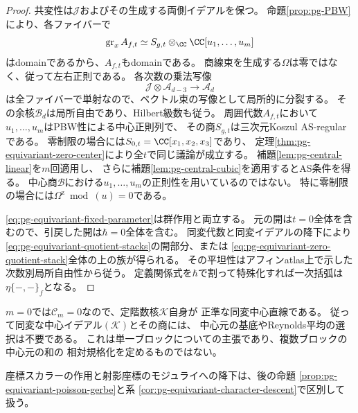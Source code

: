 \begin{proof}
共変性は$\mathcal J$およびその生成する両側イデアルを保つ。
命題\ref{prop:pg-PBW}により、各ファイバーで
\begin{equation}
 \operatorname{gr}_x A_{f,t}
 \simeq S_{g,t}\otimes_\CC\CC[u_1,\ldots,u_m]
 \label{eq:pg-equivariant-fiber-domain}
\end{equation}
はdomainであるから、$A_{f,t}$もdomainである。
商線束を生成する$\Omega$は零ではなく、従って左右正則である。
各次数の乗法写像
\begin{equation}
 \mathcal J\otimes\mathcal A_{d-3}\longrightarrow\mathcal A_d
 \label{eq:pg-equivariant-regular-multiplication}
\end{equation}
は全ファイバーで単射なので、ベクトル束の写像として局所的に分裂する。
その余核$\mathcal B_d$は局所自由であり、Hilbert級数も従う。
周囲代数$A_{f,t}$において$u_1,\ldots,u_m$はPBW性による中心正則列で、
その商$S_{g,t}$は三次元Koszul AS-regularである。
零制限の場合には$S_{0,t}=\CC[x_1,x_2,x_3]$であり、
定理\ref{thm:pg-equivariant-zero-center}により全$t$で同じ議論が成立する。
補題\ref{lem:pg-central-linear}を$m$回適用し、
さらに補題\ref{lem:pg-central-cubic}を適用するとAS条件を得る。
中心商$\mathcal B$における$u_1,\ldots,u_m$の正則性を用いているのではない。
特に零制限の場合には$\Omega^{\mathrm z}\bmod(u)=0$である。

\eqref{eq:pg-equivariant-fixed-parameter}は群作用と両立する。
元の開は$t=0$全体を含むので、引戻した開は$\hbar=0$全体を含む。
同変代数と同変イデアルの降下により
\eqref{eq:pg-equivariant-quotient-stacks}の開部分、または
\eqref{eq:pg-equivariant-zero-quotient-stack}全体の上の族が得られる。
その平坦性はアフィンatlas上で示した次数別局所自由性から従う。
定義関係式を$\hbar$で割って特殊化すれば一次括弧は
$\eta\{-,-\}_f$となる。
\end{proof}

\begin{remark}[純中心部分がない単一ブロック]
\label{rem:pg-equivariant-line-and-gerbe}
$m=0$では$\mathcal C_m=0$なので、定階数核$\mathcal K$自身が
正準な同変中心直線である。
従って同変な中心イデアル$(\mathcal K)$とその商には、
中心元の基底やReynolds平均の選択は不要である。
これは単一ブロックについての主張であり、複数ブロックの中心元の和の
相対規格化を定めるものではない。

座標スカラーの作用と射影座標のモジュライへの降下は、後の命題
\ref{prop:pg-equivariant-poisson-gerbe}と系
\ref{cor:pg-equivariant-character-descent}で区別して扱う。
\end{remark}

